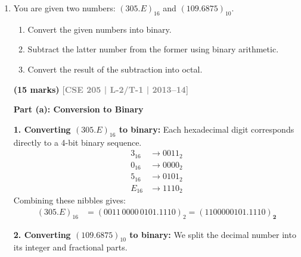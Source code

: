 \documentclass[12pt,a3paper]{article}
\newcommand{\yr}[1]{\hfill\textcolor{gray}{\small\textbf{[#1]}}}
\newcommand{\mk}[1]{\textcolor{orange!70!black}{\small\textbf{(#1 marks)}}}
\begin{document}
\begin{enumerate}
\begin{tcolorbox}[enhanced,breakable,ansbox,colback=cD!4,colframe=cD,boxrule=0.8pt,arc=5pt,title={\textbf{Answer}},fonttitle=\bfseries\color{white},colbacktitle=cD]
\vspace{1em}
\textbf{\textcolor{cD}{Final Answer}}

The decimal digits of $N$ are $2, 3, 7,$ and $9$. Therefore, the decimal number $N$ is \textbf{2379}.

\end{tcolorbox}

\item You are given two numbers: $(305.E)_{16}$ and $(109.6875)_{10}$.
\begin{enumerate}
  \item Convert the given numbers into binary.
  \item Subtract the latter number from the former using binary arithmetic.
  \item Convert the result of the subtraction into octal.
\end{enumerate}
\mk{15} \yr{CSE 205 | L-2/T-1 | 2013--14}

\begin{tcolorbox}[enhanced,breakable,ansbox,colback=cD!4,colframe=cD,boxrule=0.8pt,arc=5pt,title={\textbf{Answer}},fonttitle=\bfseries\color{white},colbacktitle=cD]

\textbf{\textcolor{cD}{Part (a): Conversion to Binary}}

\textbf{1. Converting $(305.E)_{16}$ to binary:}
Each hexadecimal digit corresponds directly to a 4-bit binary sequence.
\begin{align*}
    3_{16} &\longrightarrow 0011_2 \\
    0_{16} &\longrightarrow 0000_2 \\
    5_{16} &\longrightarrow 0101_2 \\
    E_{16} &\longrightarrow 1110_2
\end{align*}
Combining these nibbles gives:
\begin{align*}
    (305.E)_{16} &= (0011\,0000\,0101.1110)_2 = \mathbf{(1100000101.1110)_2}
\end{align*}

\textbf{2. Converting $(109.6875)_{10}$ to binary:}
We split the decimal number into its integer and fractional parts.


\end{tcolorbox}
\end{enumerate}
\end{document}

